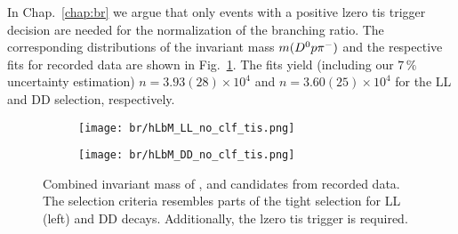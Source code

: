 In Chap.~\ref{chap:br} we argue that only events with a positive \gls{lzero} \gls{tis} trigger decision are needed for the normalization of the branching ratio.
The corresponding distributions of the invariant mass $m({{D}^0}{p}{{\pi}^-})$ and the respective fits for recorded data are shown in Fig.~\ref{fig:LbToDzppi_hLbM_no_clf_tis}.
The fits yield (including our $7\,\%$ uncertainty estimation) $n = 3.93(28) \times 10^4$ and $n = 3.60(25) \times 10^4$ for the \gls{LL} and \gls{DD} selection, respectively.
\begin{figure}[htbp]
    \centering
    \begin{subfigure}{.49\textwidth}
        \centering
        \texttt{[image: br/hLbM\_LL\_no\_clf\_tis.png]}
    \end{subfigure}
    \begin{subfigure}{.49\textwidth}
        \centering
        \texttt{[image: br/hLbM\_DD\_no\_clf\_tis.png]}
    \end{subfigure}
    \caption{Combined invariant mass of \Dz, \proton and \pim candidates from recorded data. The selection criteria resembles parts of the tight selection for \gls{LL} (left) and \gls{DD} \decay{\Lb}{\Dz\Lz} decays. Additionally, the \gls{lzero} \gls{tis} trigger is required.}
    \label{fig:LbToDzppi_hLbM_no_clf_tis}
\end{figure}

